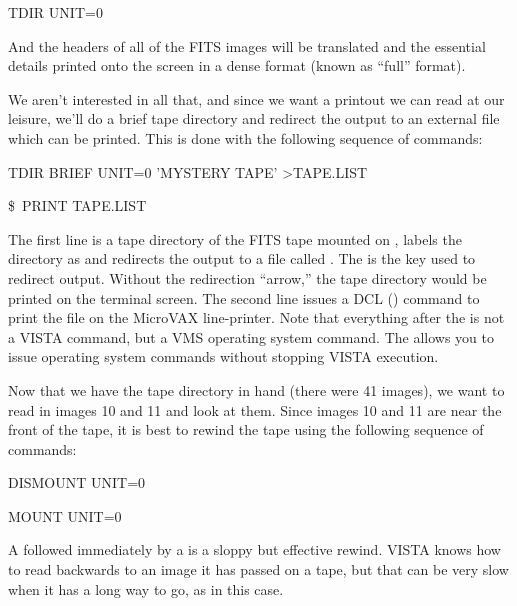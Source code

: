 {\begin{command}
      \item TDIR UNIT=0
\end{command}

\noindent
And the headers of all of the FITS images will be translated and the essential
details printed onto the screen in a dense format (known as ``full'' format).

We aren't interested in all that, and since we want a printout we can read at
our leisure, we'll do a brief tape directory and redirect the output to an
external file which can be printed.  This is done with the following sequence
of commands:

\begin{command}
      \item TDIR BRIEF UNIT=0 'MYSTERY TAPE' >TAPE.LIST
      \item \$~PRINT TAPE.LIST
\end{command}

The first line is a  tape directory of the FITS tape mounted on
, labels the directory as  and redirects the
output to a file called .  The \comm{>} is the key used to
redirect output.  Without the redirection ``arrow,'' the tape directory would
be printed on the terminal screen. The second line issues a DCL (\comm{\$})
command to print the file  on the MicroVAX line-printer.
Note that everything after the \comm{\$} is not a VISTA command, but a VMS
operating system command.  The \comm{\$} allows you to issue operating system
commands without stopping VISTA execution.

\medskip

\nobreak
Now that we have the tape directory in hand (there were 41 images), we want to
read in images 10 and 11 and look at them.  Since images 10 and 11 are near
the front of the tape, it is best to rewind the tape using the following
sequence of commands:

\begin{command}
      \item DISMOUNT UNIT=0
      \item MOUNT UNIT=0
\end{command}

A  followed immediately by a  is a sloppy but
effective rewind.  VISTA knows how to read backwards to an image it has passed
on a tape, but that can be very slow when it has a long way to go, as in this
case.

}
